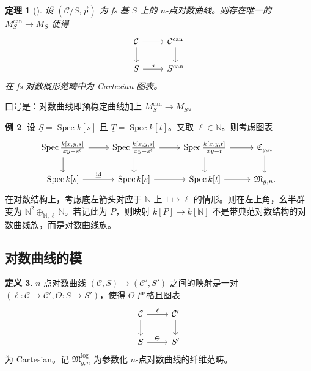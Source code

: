 \documentclass{amsart}
\newtheorem{thm}{定理}[section]
\theoremstyle{definition}
\newtheorem{defn}[thm]{定义}
\newtheorem{exm}[thm]{例}
\theoremstyle{remark}
\theoremstyle{plain}
\theoremstyle{definition}
\theoremstyle{remark}
\newcommand{\N}{\mathbb{N}}
\newcommand{\mc}[1]{\mathcal{#1}}
\newcommand{\mf}[1]{\mathfrak{#1}}
\newcommand{\on}[1]{\operatorname{#1}}
\newcommand{\ul}[1]{\underline{#1}}
\newcommand{\1}{\mathbf{1}}
\newcommand{\2}{\mathbf{2}}
\newcommand{\3}{\mathbf{3}}
\DeclareMathOperator{\Spec}{Spec}
\begin{document}
\begin{thm}[{\cite{FKato2000}}]
    设 \((\mc{C}/S, \vec{p})\) 为 fs 基 \(S\) 上的 \(n\)-点对数曲线。则存在唯一的 \(M_S^{\on{can}} \to M_S\) 使得
    \begin{equation*}
    \begin{tikzcd}
        \mc{C} \ar{d} \ar{r} & \mc{C}^{\on{can}} \ar{d} \\
        S \ar{r}{a} & S^{\on{can}}
    \end{tikzcd}
    \end{equation*}
    在 fs 对数概形范畴中为 Cartesian 图表。
\end{thm}

口号是：对数曲线即预稳定曲线加上 \(M_S^{\on{can}} \to M_S\)。

\begin{exm}
    设 \(\ul{S} = \Spec k[s]\) 且 \(\ul{T} = \Spec k[t]\)。又取 \(\ell \in \N\)。则考虑图表
    \begin{equation*}
    \begin{tikzcd}
        \Spec \frac{k{ [x,y,s] }}{xy-s^{\ell}} \ar{d} \ar{r} & \Spec \frac{k{ [x,y,s] }}{xy-s^{\ell}} \ar{d} \ar{r} & \Spec  \frac{k{[x,y,t]}}{xy-t} \ar{r}\ar{d} & \mf{C}_{g,n} \ar{d} \\
        \Spec k{[s]} \ar{r}{\ul{ \on{id} }} & \Spec {k[s]} \ar{r} & \Spec k{[t]} \ar{r} & \mf{M}_{g,n}.
    \end{tikzcd}
    \end{equation*}
    在对数结构上，考虑底左箭头对应于 \(\N\) 上 \(1 \mapsto \ell\) 的情形。则在左上角，幺半群变为 \(\N^2 \oplus_{\N, \ell} \N\)。若记此为 \(P\)，则映射 \(k[P] \to k[\N]\) 不是带典范对数结构的对数曲线族，而是对数曲线族。
\end{exm}

\subsection{对数曲线的模}%
\label{sub:Moduli of log curves}

\begin{defn}
    \(n\)-点对数曲线 \((\mc{C}, S) \to (\mc{C}', S')\) 之间的映射是一对 \((\ell \colon \mc{C} \to \mc{C}', \Theta \colon S \to S')\)，使得 \(\Theta\) 严格且图表
    \begin{equation*}
    \begin{tikzcd}
        \mc{C} \ar{d} \ar{r}{\ell} & \mc{C}' \ar{d} \\
        S \ar{r}{\Theta} & S'
    \end{tikzcd}
    \end{equation*}
    为 Cartesian。记 \(\mf{M}_{g,n}^{\log}\) 为参数化 \(n\)-点对数曲线的纤维范畴。
\end{defn}
\end{document}
